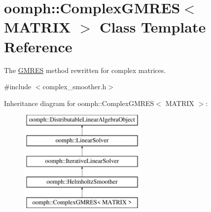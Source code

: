 \hypertarget{classoomph_1_1ComplexGMRES}{}\section{oomph\+:\+:Complex\+G\+M\+R\+ES$<$ M\+A\+T\+R\+IX $>$ Class Template Reference}
\label{classoomph_1_1ComplexGMRES}


The \hyperlink{classoomph_1_1GMRES}{G\+M\+R\+ES} method rewritten for complex matrices.  




{\ttfamily \#include $<$complex\+\_\+smoother.\+h$>$}

Inheritance diagram for oomph\+:\+:Complex\+G\+M\+R\+ES$<$ M\+A\+T\+R\+IX $>$\+:\begin{figure}[H]
\begin{center}
\leavevmode
\includegraphics[height=5.000000cm]{classoomph_1_1ComplexGMRES}
\end{center}
\end{figure}
